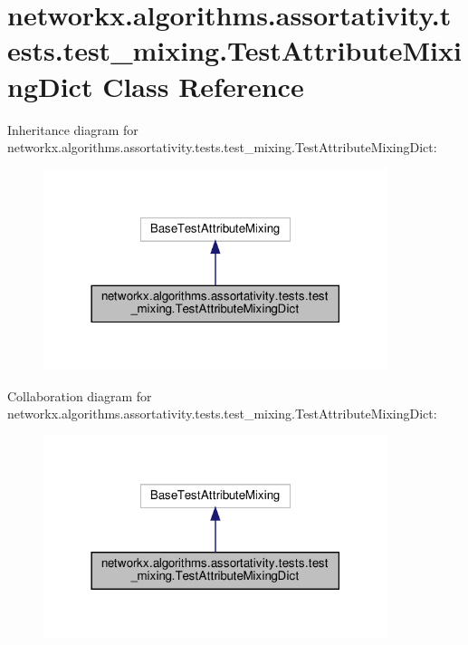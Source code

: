 \hypertarget{classnetworkx_1_1algorithms_1_1assortativity_1_1tests_1_1test__mixing_1_1TestAttributeMixingDict}{}\section{networkx.\+algorithms.\+assortativity.\+tests.\+test\+\_\+mixing.\+Test\+Attribute\+Mixing\+Dict Class Reference}
\label{classnetworkx_1_1algorithms_1_1assortativity_1_1tests_1_1test__mixing_1_1TestAttributeMixingDict}


Inheritance diagram for networkx.\+algorithms.\+assortativity.\+tests.\+test\+\_\+mixing.\+Test\+Attribute\+Mixing\+Dict\+:
\nopagebreak
\begin{figure}[H]
\begin{center}
\leavevmode
\includegraphics[width=285pt]{classnetworkx_1_1algorithms_1_1assortativity_1_1tests_1_1test__mixing_1_1TestAttributeMixingDict__inherit__graph}
\end{center}
\end{figure}


Collaboration diagram for networkx.\+algorithms.\+assortativity.\+tests.\+test\+\_\+mixing.\+Test\+Attribute\+Mixing\+Dict\+:
\nopagebreak
\begin{figure}[H]
\begin{center}
\leavevmode
\includegraphics[width=285pt]{classnetworkx_1_1algorithms_1_1assortativity_1_1tests_1_1test__mixing_1_1TestAttributeMixingDict__coll__graph}
\end{center}
\end{figure}

